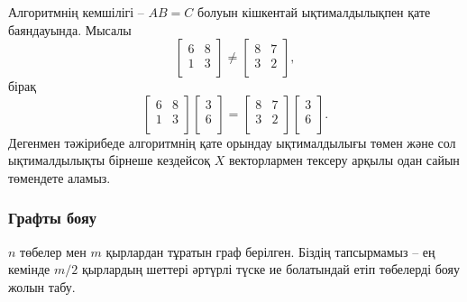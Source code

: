Алгоритмнің кемшілігі --
 $AB=C$ болуын кішкентай ықтималдылықпен қате баяндауында. 
Мысалы
\[
 \begin{bmatrix}
  6 & 8 \\
  1 & 3 \\
 \end{bmatrix}
\neq
 \begin{bmatrix}
  8 & 7 \\
  3 & 2 \\
 \end{bmatrix},
\]
бірақ
\[
 \begin{bmatrix}
  6 & 8 \\
  1 & 3 \\
 \end{bmatrix}
 \begin{bmatrix}
  3 \\
  6 \\
 \end{bmatrix}
=
 \begin{bmatrix}
  8 & 7 \\
  3 & 2 \\
 \end{bmatrix}
 \begin{bmatrix}
  3 \\
  6 \\
 \end{bmatrix}.
\]
Дегенмен тәжірибеде алгоритмнің қате орындау ықтималдылығы
төмен және сол ықтималдылықты бірнеше кездейсоқ
$X$ векторлармен тексеру арқылы одан сайын төмендете аламыз. 

\subsubsection{Графты бояу}


$n$ төбелер мен $m$ қырлардан тұратын граф берілген.
Біздің тапсырмамыз -- ең кемінде $m/2$ қырлардың 
шеттері әртүрлі түске ие болатындай етіп төбелерді бояу
жолын табу.  

